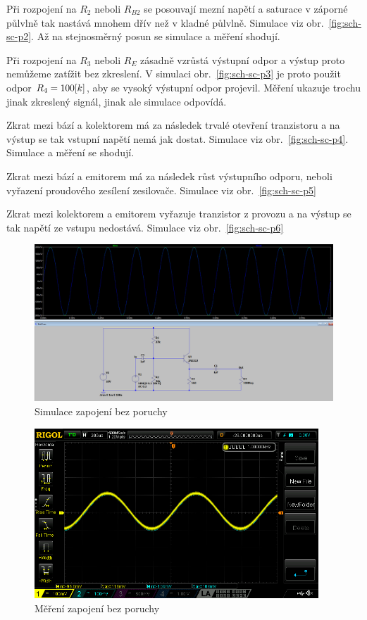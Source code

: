 \documentclass{article}
\newcommand \obr[1]
{ obr.~\ref{#1}}
\begin{document}
Při rozpojení na \(R_2\) neboli \(R_{B2}\) se posouvají mezní napětí a saturace v záporné půlvlně tak nastává mnohem dřív než v kladné půlvlně.
Simulace viz \obr{fig:sch-sc-p2}.
Až na stejnosměrný posun se simulace a měření shodují.

Při rozpojení na \(R_3\) neboli \(R_E\) zásadně vzrůstá výstupní odpor a výstup proto nemůžeme zatížit bez zkreslení.
V simulaci \obr{fig:sch-sc-p3} je proto použit odpor \(R_4 = 100\-[k]\), aby se vysoký výstupní odpor projevil.
Měření ukazuje trochu jinak zkreslený signál, jinak ale simulace odpovídá.


Zkrat mezi bází a kolektorem má za následek trvalé otevření tranzistoru a na výstup se tak vstupní napětí nemá jak dostat. 
Simulace viz \obr{fig:sch-sc-p4}.
Simulace a měření se shodují.


Zkrat mezi bází a emitorem má za následek růst výstupního odporu, neboli vyřazení proudového zesílení zesilovače.
Simulace viz \obr{fig:sch-sc-p5}


Zkrat mezi kolektorem a emitorem vyřazuje tranzistor z provozu a na výstup se tak napětí ze vstupu nedostává.
Simulace viz \obr{fig:sch-sc-p6}


\begin{figure}[H]
  \centering
  \includegraphics[width=\textwidth]{sim/ukol2/bezPoruch.png}
  \caption{Simulace zapojení bez poruchy}
  \label{fig:sch-sc-bezPoruch}
\end{figure}

\begin{figure}[H]
  \centering
  \includegraphics[width=0.95\textwidth]{mereni/NewFolder1/NewFile8.png}
  \caption{Měření zapojení bez poruchy}
  \label{fig:m-sch-sc-bezPoruch}
\end{figure}
\end{document}
